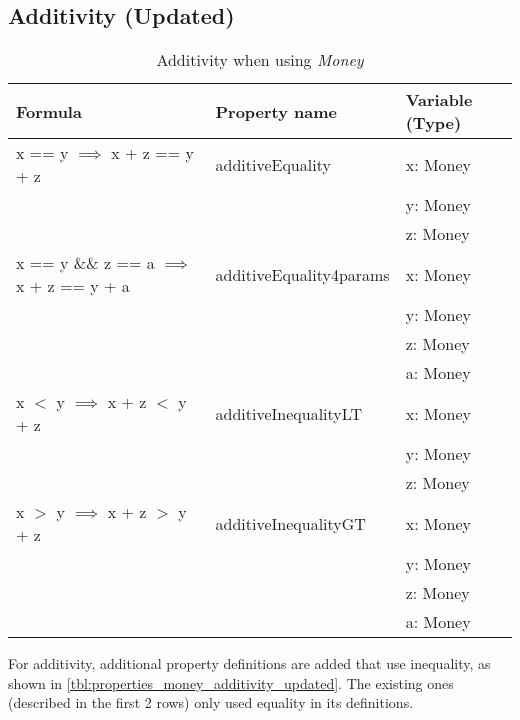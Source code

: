 \subsection*{Additivity (Updated)}
\label{ssct:properties_additivity_updated}
\begin{table}[!ht]
\centering
\begin{tabular}{lll}
\hline
                        \textbf{Formula}                             & \textbf{Property name}  & \textbf{Variable (Type)} \\ \hline
\rowcolor[HTML]{EFEFEF} x == y $\implies$ x + z == y + z             & additiveEquality        & x: Money                 \\
\rowcolor[HTML]{EFEFEF}                                              &                         & y: Money                 \\
\rowcolor[HTML]{EFEFEF}                                              &                         & z: Money                 \\
                        x == y \&\& z == a $\implies$ x + z == y + a & additiveEquality4params & x: Money                 \\
                                                                     &                         & y: Money                 \\
                                                                     &                         & z: Money                 \\
                                                                     &                         & a: Money                 \\
\rowcolor[HTML]{EFEFEF} x $<$ y $\implies$ x + z $<$ y + z           & additiveInequalityLT    & x: Money                 \\
\rowcolor[HTML]{EFEFEF}                                              &                         & y: Money                 \\
\rowcolor[HTML]{EFEFEF}                                              &                         & z: Money                 \\
                        x $>$ y $\implies$ x + z $>$ y + z           & additiveInequalityGT    & x: Money                 \\
                                                                     &                         & y: Money                 \\
                                                                     &                         & z: Money                 \\
                                                                     &                         & a: Money                 \\ \hline
\end{tabular}
\caption{Additivity when using \textit{Money}}
\label{tbl:properties_money_additivity_updated}
\end{table}
\FloatBarrier\noindent
For additivity, additional property definitions are added that use inequality,
as shown in \autoref{tbl:properties_money_additivity_updated}. The existing ones
(described in the first 2 rows) only used equality in its definitions.

